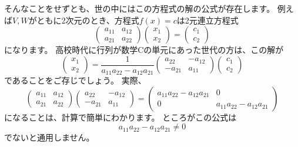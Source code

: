 そんなことをせずとも、世の中にはこの方程式の解の公式が存在します。
例えば$V,W$がともに2次元のとき、方程式$f(x)=c$は2元連立方程式
\[
  \begin{pmatrix}
    a_{11} & a_{12} \\
    a_{21} & a_{22}
  \end{pmatrix}
  \begin{pmatrix}
    x_1 \\ x_2
  \end{pmatrix}
  =
  \begin{pmatrix}
    c_1 \\ c_2
  \end{pmatrix}
\]
になります。
高校時代に行列が数学Cの単元にあった世代の方は、この解が
\[
  \begin{pmatrix}
    x_1 \\ x_2
  \end{pmatrix}
  =
  \frac{1}{a_{11}a_{22}-a_{12}a_{21}}
  \begin{pmatrix}
    a_{22} & -a_{12} \\
    -a_{21} & a_{11}
  \end{pmatrix}
  \begin{pmatrix}
    c_1 \\ c_2
  \end{pmatrix}
\]
であることをご存じでしょう。
実際、
\[
  \begin{pmatrix}
    a_{11} & a_{12} \\
    a_{21} & a_{22}
  \end{pmatrix}
  \begin{pmatrix}
    a_{22} & -a_{12} \\
    -a_{21} & a_{11}
  \end{pmatrix}
  =
  \begin{pmatrix}
    a_{11}a_{22}-a_{12}a_{21} & 0 \\
    0 & a_{11}a_{22}-a_{12}a_{21}
  \end{pmatrix}
\]
になることは、計算で簡単にわかります。
ところがこの公式は
\[
  a_{11}a_{22}-a_{12}a_{21}\neq0
\]
でないと通用しません。


